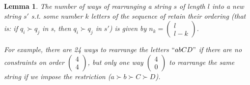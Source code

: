 \documentclass{article}
\newtheorem{lemma}{Lemma}
\begin{document}
\begin{lemma}
The number of ways of rearranging a string $s$ of length $l$ into a new string $s'$ s.t. some number $k$ letters of the sequence of retain their ordering (that is: if $q_i \succ q_{j}$ in s, then $q_i \succ q_{j}$ in $s'$) is given by $n_k = \begin{pmatrix}
     l \\ l-k
  \end{pmatrix}$. 
  
  For example, there are 24 ways to rearrange the letters $``abCD"$ if there are no constraints on order $\begin{pmatrix} 4 \\ 4 \end{pmatrix}$, but only one way  $\begin{pmatrix} 4 \\ 0 \end{pmatrix}$ to rearrange the same string if we impose the restriction ($a \succ b \succ C \succ D$).
\label{lem:rear}
\end{lemma}
\end{document}
